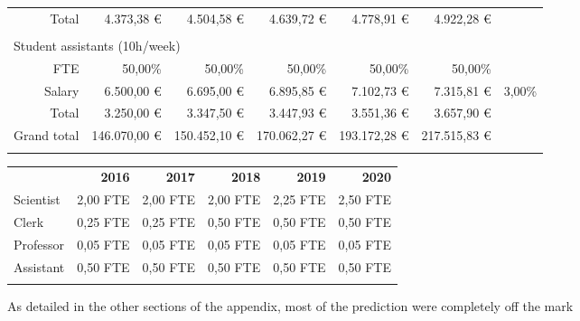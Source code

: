 \documentclass[output=guidelines,nonflat,smallfont,
draftmode
]{langsci/langscibook}
\newcommand{\background}[1]{ 
  \vspace{5mm}
  \renewcommand{\tblslinecolour}{lsDarkBlue}
  \tblssy[red]{explore2}{Background}{\vspace*{-5mm}#1}
}
\newcommand{\langscisolution}[1]{
  \renewcommand{\tblslinecolour}{lsLightBlue}
  \tblssy{langsci}{LangSci solution}{\vspace*{-5mm}#1}
}
\newcommand{\evaluation}[1]{
  \renewcommand{\tblslinecolour}{lsLightOrange}
  \tblssy{receipt}{Evaluation}{\vspace*{-5mm}#1}
}
\newcommand{\othersolutions}[1]{
  \renewcommand{\tblslinecolour}{lsDarkGreenOne}
  \tblssy{more}{Other solutions}{\vspace*{-5mm}#1}
}
\renewcommand{\tblssy}[4][black!12]{%
  \renewcommand{\langscisymbol}{#2}\renewcommand{\tblsboxcolor}{#1}
  \begin{mdframed}[style=yellowexercise,frametitle={#3}]
    #4
  \end{mdframed}
}
\begin{document}
{{\begin{tabular}{lrrrrrrr}
 &  Total &  4.373,38 € &  4.504,58 € &  4.639,72 € &  4.778,91 € &  4.922,28 € & ~\\
\\
\multicolumn{5}{l}{ Student assistants (10h/week)}\\
\midrule
&  FTE &  50,00\% &  50,00\% &  50,00\% &  50,00\% &  50,00\% & ~\\
&  Salary &  6.500,00 € &  6.695,00 € &  6.895,85 € &  7.102,73 € &  7.315,81 € &  3,00\%\\
 &  Total &  3.250,00 € &  3.347,50 € &  3.447,93 € &  3.551,36 € &  3.657,90 € & ~\\
\midrule
\multicolumn{2}{l}{Grand total}  &  146.070,00 € &  150.452,10 € &  170.062,27 € &  193.172,28 € &  217.515,83 € & ~\\
\lspbottomrule
\end{tabular}
}

{\footnotesize
\noindent
\begin{tabularx}{\textwidth}{Xrrrrr}
\lsptoprule
  & \textbf{2016} & \textbf{2017} & \textbf{2018} & \textbf{2019} & \textbf{2020}\\
Scientist &  2,00 FTE &  2,00 FTE &  2,00 FTE &  2,25 FTE &  2,50 FTE\\
Clerk &  0,25 FTE &  0,25 FTE &  0,50 FTE &  0,50 FTE &  0,50 FTE\\
Professor &  0,05 FTE &  0,05 FTE &  0,05 FTE &  0,05 FTE &  0,05 FTE\\
Assistant &  0,50 FTE &  0,50 FTE &  0,50 FTE &  0,50 FTE &  0,50 FTE\\
\lspbottomrule
\end{tabularx} 
}
}
\evaluation{As detailed in the other sections of the appendix, most of the prediction were completely off the mark}
  
\end{document}

